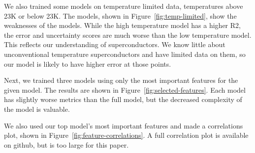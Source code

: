 \documentclass[twocolumn, nofootinbib, secnumarabic, amssymb, nobibnotes, aps, prd]{revtex4-2}
\begin{document}

We also trained some models on temperature limited data, temperatures above 23K or below 23K. The models, shown in Figure~\ref{fig:temp-limited}, show the weaknesses of the models. While the high temperature model has a higher R2, the error and uncertainty scores are much worse than the low temperature model. This reflects our understanding of superconductors. We know little about unconventional temperature superconductors and have limited data on them, so our model is likely to have higher error at those points.

Next, we trained three models using only the most important features for the given model. The results are shown in Figure~\ref{fig:selected-features}. Each model has slightly worse metrics than the full model, but the decreased complexity of the model is valuable.

We also used our top model's most important features and made a correlations plot, shown in Figure~\ref{fig:feature-correlations}. A full correlation plot is available on github, but is too large for this paper.
\end{document}
